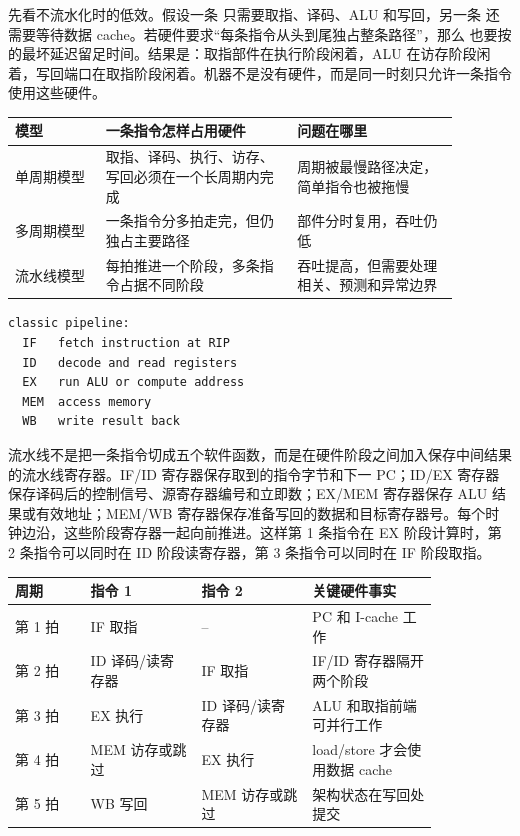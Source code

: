 先看不流水化时的低效。假设一条  只需要取指、译码、ALU 和写回，另一条  还需要等待数据 cache。若硬件要求“每条指令从头到尾独占整条路径”，那么  也要按  的最坏延迟留足时间。结果是：取指部件在执行阶段闲着，ALU 在访存阶段闲着，写回端口在取指阶段闲着。机器不是没有硬件，而是同一时刻只允许一条指令使用这些硬件。

\begin{longtable}{p{0.18\linewidth}p{0.38\linewidth}p{0.32\linewidth}}
\toprule
模型 & 一条指令怎样占用硬件 & 问题在哪里 \\
\midrule
单周期模型 & 取指、译码、执行、访存、写回必须在一个长周期内完成 & 周期被最慢路径决定，简单指令也被拖慢 \\
多周期模型 & 一条指令分多拍走完，但仍独占主要路径 & 部件分时复用，吞吐仍低 \\
流水线模型 & 每拍推进一个阶段，多条指令占据不同阶段 & 吞吐提高，但需要处理相关、预测和异常边界 \\
\bottomrule
\end{longtable}

\begin{lstlisting}
classic pipeline:
  IF   fetch instruction at RIP
  ID   decode and read registers
  EX   run ALU or compute address
  MEM  access memory
  WB   write result back
\end{lstlisting}

流水线不是把一条指令切成五个软件函数，而是在硬件阶段之间加入保存中间结果的流水线寄存器。IF/ID 寄存器保存取到的指令字节和下一 PC；ID/EX 寄存器保存译码后的控制信号、源寄存器编号和立即数；EX/MEM 寄存器保存 ALU 结果或有效地址；MEM/WB 寄存器保存准备写回的数据和目标寄存器号。每个时钟边沿，这些阶段寄存器一起向前推进。这样第 1 条指令在 EX 阶段计算时，第 2 条指令可以同时在 ID 阶段读寄存器，第 3 条指令可以同时在 IF 阶段取指。

\begin{longtable}{p{0.15\linewidth}p{0.22\linewidth}p{0.22\linewidth}p{0.25\linewidth}}
\toprule
周期 & 指令 1 & 指令 2 & 关键硬件事实 \\
\midrule
第 1 拍 & IF 取指 & -- & PC 和 I-cache 工作 \\
第 2 拍 & ID 译码/读寄存器 & IF 取指 & IF/ID 寄存器隔开两个阶段 \\
第 3 拍 & EX 执行 & ID 译码/读寄存器 & ALU 和取指前端可并行工作 \\
第 4 拍 & MEM 访存或跳过 & EX 执行 & load/store 才会使用数据 cache \\
第 5 拍 & WB 写回 & MEM 访存或跳过 & 架构状态在写回处提交 \\
\bottomrule
\end{longtable}

